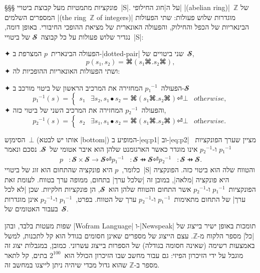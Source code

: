 §§§ פונקציות מתמטיות מעל קבוצת ביטויי~\E|S|.
על ה\ע|חוג החילופי| \E|(abelian ring)|~$ℤ$ של המספרים השלמים \E|(the ring~$ℤ$
of integers)| מוגדרות שלוש פעולות: שתי הפעולות הבינאריות של הכפל והחילוק,
והפעולה האונארית של מציאת ההופכי החיבורי. באופן דומה, נגדיר שלוש פעולות על כל
קבוצה~$𝓢$ של ביטויי~\E|S|:
\begin{enumerate}
  ✦ הפעולה הבינארית~$p$ המצרפת ב-\E|dotted-pair| שני ביטויים של~$𝓢$,
  \begin{equation}
    p(s₁,s₂)=⌘(s₁⌘.s₂⌘),
  \end{equation}
  ✦ ושתי הפעולות האונאריות ההופכיות לה:
  \begin{enumerate}
    ✦ הפעולה~$p₁^{-1}$ המחזירה את המרכיב
    הראשון של ביטוי מורכב ב-$𝓢$
    \begin{equation}\label{eq:p1}
      p₁^{-1}(s)=\begin{cases}
        s₁ & ∃ s₂, s₁ ∙ s₂=⌘(s₁⌘.s₂⌘) ⏎
        ⊥  & \textit{otherwise},
      \end{cases}
    \end{equation}
    ✦ והפעולה~$p₂^{-1}$ המחזירה את המרכיב השני של ביטוי כזה,
    \begin{equation}\label{eq:p2}
      p₂^{-1}(s)=\begin{cases}
        s₂ & ∃ s₁, s₁ ∙ s₂=⌘(s₁⌘.s₂⌘) ⏎
        ⊥  & \textit{otherwise}.
      \end{cases}
    \end{equation}
  \end{enumerate}
\end{enumerate}
הסימןש~$⊥$ (אותו יש לבטא \E|bottom|) המופיע ב-|eq:p1| וב-|eq:p2|
מציין שערך הפונקציות~$p₁^{-1}$ ו-$p₂^{-1}$ אינו מוגדר כאשר הארגומנט שלהן הוא
איבר אטומי של~$𝓢$. נסכם ונאמר
\begin{equation}
  \begin{split}
    p&:𝓢×𝓢→𝓢⏎
    p₁^{-1}&:𝓢 ⇸𝓢⏎
    p₂^{-1}&:𝓢 ⇸𝓢.
  \end{split}
\end{equation}
כלומר,~$p$ היא פונקציה שהתחום הוא זוג של ביטויי~\E|S| והטווח שלה הוא ביטוי כזה.
הפונקציה היא פונקציה \ע|מלאה|, במובן זה \ע|שלכל ערך| בתחום, ממופה ערך בטווח.
לעומת זאת הפונקציות~$p₁^{-1}$ ו-$p₂^{-1}$ אשר התחום והטווח שלהן הוא~$𝓢$, הן
פונקציות חלקיות. שכן \ע|לא לכל ערך| של התחום מתאימות~$p₁^{-1}$ ו-$p₂^{-1}$ ערך
של הטווח. בפרט,~$p₁^{-1}$ ו-$p₂^{-1}$ אינן מוגדרות בעבור האטומים של~$𝓢$.

שפות מעטות בלבד, ובהן \E|Wofram Language| ו-\E|Newspeak| תומכות באופן ישיר
בייצוג של \ע|כל| מספר הלקוח מ-$ℤ$. עצם הייצוג של מספרים שאינן חסומים בגודל
הוא קל לתכנות, למשל באמצעות רשימה (שאינה חסומה בגודלה) של הספרות בייצוג עשרוני.
כמובן, במגבלות יצוג זה מוגבל על ידי הזיכרון הפיזי: גם עבור מחשב שבו הזיכרון
הכולל הוא~$2^{100}$ בתים, קל לתאר מספר ב-$ℤ$ שהוא גדול מכדי שיהיה ניתן לייצגו
במחשב זה.

